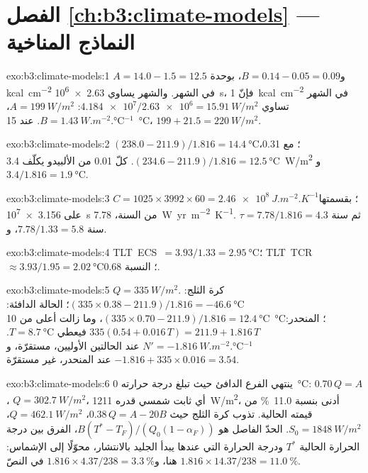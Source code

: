\section*{الفصل \ref{ch:b3:climate-models} --- النماذج المناخية}

\begin{solution}{exo:b3:climate-models:1}
$A = 14.0 - 1.5 = \num{12.5}$ و$B = 0.14 - 0.05 = \num{0.09}$، بوحدة
\unit{kcal.cm^{-2}} في الشهر. والشهر يساوي \qty{2.63e6}{s}، فإنّ
\qty{1}{kcal.cm^{-2}} في الشهر تساوي $\num{4.184e7}/\num{2.63e6} =
\qty{15.91}{W/m^2}$: $A = \qty{199}{W/m^2}$، $B =
\qty{1.43}{W.m^{-2}.\celsius^{-1}}$. عند \qty{15}{\celsius}، $199 + 21.5 =
\qty{220}{W/m^2}$.
\end{solution}

\begin{solution}{exo:b3:climate-models:2}
$(238.0 - 211.9)/1.816 = \qty{14.4}{\celsius}$؛ مع 0.31، $(234.6 -
211.9)/1.816 = \qty{12.5}{\celsius}$. كلّ 0.01 من الألبيدو يكلّف
\qty{3.4}{W/m^2} و$3.4/1.816 = \qty{1.9}{\celsius}$.
\end{solution}

\begin{solution}{exo:b3:climate-models:3}
$C = 1025\times3992\times60 = \qty{2.46e8}{J.m^{-2}.K^{-1}}$؛ بقسمتها على
\qty{3.156e7}{s} من السنة، \qty{7.78}{W.yr.m^{-2}.K^{-1}}. ثم $\tau
= 7.78/1.816 = \num{4.3}\text{ سنة}$، و$7.78/1.33 = \num{5.8}\text{ سنة}$.
\end{solution}

\begin{solution}{exo:b3:climate-models:4}
\mbox{\textdir TLT ECS $= 3.93/1.33 = \qty{2.95}{\celsius}$}؛ \mbox{\textdir TLT TCR} $\approx 3.93/1.95 =
\qty{2.02}{\celsius}$؛ النسبة \num{0.68}.
\end{solution}

\begin{solution}{exo:b3:climate-models:5}
$Q = \qty{335}{W/m^2}$. كرة الثلج: $(335\times0.38 - 211.9)/1.816 =
\qty{-46.6}{\celsius}$؛ الحالة الدافئة: $(335\times0.70 - 211.9)/1.816 =
\qty{12.4}{\celsius}$، وما زالت أعلى من \qty{10}{\celsius}؛ المنحدر: $335(0.54 +
0.016\,T) = 211.9 + 1.816\,T$ فيعطي $T = \qty{8.7}{\celsius}$. $N' =
\qty{-1.816}{W.m^{-2}.\celsius^{-1}}$ عند الحالتين الأوليين، مستقرّة، و$-1.816
+ 335\times0.016 = \num{+3.54}$ عند المنحدر، غير مستقرّة.
\end{solution}

\begin{solution}{exo:b3:climate-models:6}
ينتهي الفرع الدافئ حيث تبلغ درجة حرارته \qty{0}{\celsius}:
$0.70\,Q = A$، $Q = \qty{302.7}{W/m^2}$، أي ثابت شمسي قدره
\qty{1211}{W/m^2}، أدنى بنسبة \qty{11.0}{\percent} من قيمته الحالية. تذوب كرة الثلج
حيث $0.38\,Q = A - 20B$، $Q = \qty{462.1}{W/m^2}$، $S_0 =
\qty{1848}{W/m^2}$. الحدّ الفاصل هو $B(T^* - T_F)/(Q_0(1 - \alpha_F))$،
الفرق بين درجة الحرارة الحالية $T^*$ ودرجة الحرارة التي عندها
يبدأ الجليد بالانتشار، محوّلًا إلى الإشماس: $1.816\times14.37/238 =
\qty{11.0}{\percent}$ هنا، و$1.816\times4.37/238 = \qty{3.3}{\percent}$ في
النصّ.
\end{solution}


